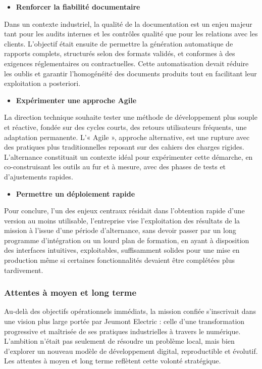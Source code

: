\documentclass[11pt,a4paper]{article}
\begin{document}
\begin{itemize}
\item \textbf{Renforcer la fiabilité documentaire } \
\end{itemize}

Dans un contexte industriel, la qualité de la documentation est un enjeu majeur tant pour les audits internes et les contrôles qualité que pour les relations avec les clients. L’objectif était ensuite de permettre la génération automatique de rapports complets, structurés selon des formats validés, et conformes à des exigences réglementaires ou contractuelles. Cette automatisation devait réduire les oublis et garantir l’homogénéité des documents produits tout en facilitant leur exploitation a posteriori.

\begin{itemize}
\item \textbf{Expérimenter une approche Agile  } \
\end{itemize}

La direction technique souhaite tester une méthode de développement plus souple et réactive, fondée sur des cycles courts, des retours utilisateurs fréquents, une adaptation permanente. L’« Agile », approche alternative, est une rupture avec des pratiques plus traditionnelles reposant sur des cahiers des charges rigides. L’alternance constituait un contexte idéal pour expérimenter cette démarche, en co-construisant les outils au fur et à mesure, avec des phases de tests et d’ajustements rapides.

\newpage
\begin{itemize}
\item \textbf{Permettre un déploiement rapide  } 
\end{itemize}

Pour conclure, l’un des enjeux centraux résidait dans l’obtention rapide d’une version au moins utilisable, l’entreprise vise l’exploitation des résultats de la mission à l’issue d’une période d’alternance, sans devoir passer par un long programme d’intégration ou un lourd plan de formation, en ayant à disposition des interfaces intuitives, exploitables, suffisamment solides pour une mise en production même si certaines fonctionnalités devaient être complétées plus tardivement.
\subsubsection{Attentes à moyen et long terme}

Au-delà des objectifs opérationnels immédiats, la mission confiée s’inscrivait dans une vision plus large portée par Jeumont Electric : celle d’une transformation progressive et maîtrisée de ses pratiques industrielles à travers le numérique. L’ambition n’était pas seulement de résoudre un problème local, mais bien d’explorer un nouveau modèle de développement digital, reproductible et évolutif. Les attentes à moyen et long terme reflètent cette volonté stratégique. 
\end{document}
